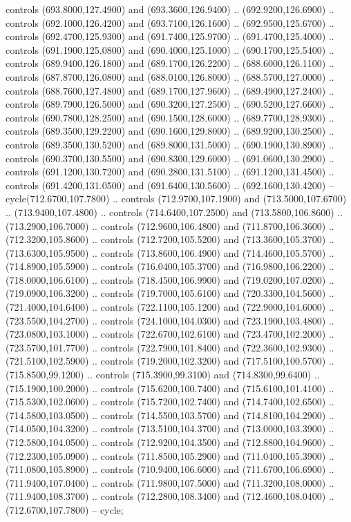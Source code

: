 {\begin{scope}[y=0.80pt, x=0.80pt, yscale=-1, xscale=1, inner sep=0pt, outer sep=0pt, #1]
      controls (693.8000,127.4900) and (693.3600,126.9400) .. (692.9200,126.6900) ..
      controls (692.1000,126.4200) and (693.7100,126.1600) .. (692.9500,125.6700) ..
      controls (692.4700,125.9300) and (691.7400,125.9700) .. (691.4700,125.4000) ..
      controls (691.1900,125.0800) and (690.4000,125.1000) .. (690.1700,125.5400) ..
      controls (689.9400,126.1800) and (689.1700,126.2200) .. (688.6000,126.1100) ..
      controls (687.8700,126.0800) and (688.0100,126.8000) .. (688.5700,127.0000) ..
      controls (688.7600,127.4800) and (689.1700,127.9600) .. (689.4900,127.2400) ..
      controls (689.7900,126.5000) and (690.3200,127.2500) .. (690.5200,127.6600) ..
      controls (690.7800,128.2500) and (690.1500,128.6000) .. (689.7700,128.9300) ..
      controls (689.3500,129.2200) and (690.1600,129.8000) .. (689.9200,130.2500) ..
      controls (689.3500,130.5200) and (689.8000,131.5000) .. (690.1900,130.8900) ..
      controls (690.3700,130.5500) and (690.8300,129.6000) .. (691.0600,130.2900) ..
      controls (691.1200,130.7200) and (690.2800,131.5100) .. (691.1200,131.4500) ..
      controls (691.4200,131.0500) and (691.6400,130.5600) .. (692.1600,130.4200) --
      cycle(712.6700,107.7800) .. controls (712.9700,107.1900) and
      (713.5000,107.6700) .. (713.9400,107.4800) .. controls (714.6400,107.2500) and
      (713.5800,106.8600) .. (713.2900,106.7000) .. controls (712.9600,106.4800) and
      (711.8700,106.3600) .. (712.3200,105.8600) .. controls (712.7200,105.5200) and
      (713.3600,105.3700) .. (713.6300,105.9500) .. controls (713.8600,106.4900) and
      (714.4600,105.5700) .. (714.8900,105.5900) .. controls (716.0400,105.3700) and
      (716.9800,106.2200) .. (718.0000,106.6100) .. controls (718.4500,106.9900) and
      (719.0200,107.0200) .. (719.0900,106.3200) .. controls (719.7000,105.6100) and
      (720.3300,104.5600) .. (721.4000,104.6400) .. controls (722.1100,105.1200) and
      (722.9000,104.6000) .. (723.5500,104.2700) .. controls (724.1000,104.0300) and
      (723.1900,103.4800) .. (723.0800,103.1000) .. controls (722.6700,102.6100) and
      (723.4700,102.2000) .. (723.5700,101.7700) .. controls (722.7900,101.8400) and
      (722.3600,102.9300) .. (721.5100,102.5900) .. controls (719.2000,102.3200) and
      (717.5100,100.5700) .. (715.8500,99.1200) .. controls (715.3900,99.3100) and
      (714.8300,99.6400) .. (715.1900,100.2000) .. controls (715.6200,100.7400) and
      (715.6100,101.4100) .. (715.5300,102.0600) .. controls (715.7200,102.7400) and
      (714.7400,102.6500) .. (714.5800,103.0500) .. controls (714.5500,103.5700) and
      (714.8100,104.2900) .. (714.0500,104.3200) .. controls (713.5100,104.3700) and
      (713.0000,103.3900) .. (712.5800,104.0500) .. controls (712.9200,104.3500) and
      (712.8800,104.9600) .. (712.2300,105.0900) .. controls (711.8500,105.2900) and
      (711.0400,105.3900) .. (711.0800,105.8900) .. controls (710.9400,106.6000) and
      (711.6700,106.6900) .. (711.9400,107.0400) .. controls (711.9800,107.5000) and
      (711.3200,108.0000) .. (711.9400,108.3700) .. controls (712.2800,108.3400) and
      (712.4600,108.0400) .. (712.6700,107.7800) -- cycle;


\end{scope}}
